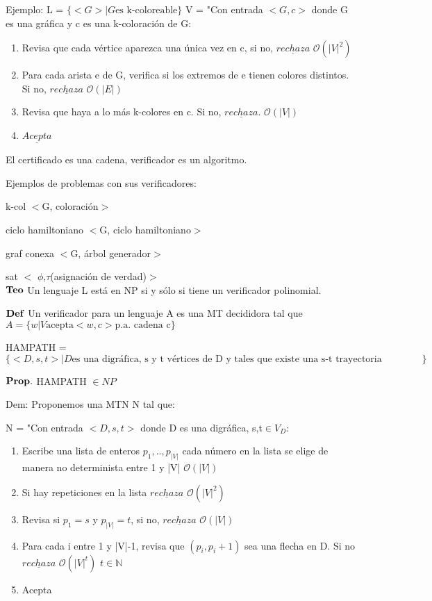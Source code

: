 \documentclass{homework}
\begin{document}
Ejemplo:
L = $\{<G>| G \text{es k-coloreable}\}$
V = "Con entrada $<G,c>$ donde G es una gráfica y c es una k-coloración de G:
\begin{enumerate}
	\item Revisa que cada vértice aparezca una única vez en c, si no, $\underline{rechaza}$ $\mathcal{O}(|V|^{2})$
	\item  Para cada arista e de G, verifica si los extremos de e tienen colores distintos. Si no, $\underline{rechaza}$ $\mathcal{O}(|E|)$
	\item Revisa que haya a lo más k-colores en c. Si no, $\underline{rechaza}$. $\mathcal{O}(|V|)$
	\item  $\underline{Acepta}$
\end{enumerate}

El certificado es una cadena, verificador es un algoritmo.

Ejemplos de problemas con sus verificadores:

k-col $<$G, coloración$>$

ciclo hamiltoniano $<$G, ciclo hamiltoniano$>$

graf conexa $<$G, árbol generador$>$

sat $<$ $\phi$,$\tau$(asignación de verdad)$>$\\

$\bf{Teo}$ Un lenguaje L está en NP si y sólo si tiene un verificador polinomial.

$\bf{Def}$ Un verificador para un lenguaje A es una MT decididora tal que $A =\{w | V \text{acepta} <w,c> \text{p.a. cadena c}\}$

HAMPATH = $\{<D,s,t>| D \text{es una digráfica, s y t vértices de D y tales que existe una s-t trayectoria hamiltoniana} \}$

$\bf{Prop.}$ HAMPATH $\in NP$

Dem: Proponemos una MTN N tal que: 

N = "Con entrada $<D,s,t>$ donde D es una digráfica, s,t$\in V_D$:
\begin{enumerate}
	\item Escribe una lista de enteros $p_1,..,p_{|V|}$ cada número en la lista se elige de manera no determinista entre 1 y |V| $\mathcal{O}(|V|)$
	\item Si hay repeticiones en la lista $\underline{rechaza}$ $\mathcal{O}(|V|^{2})$
	\item Revisa si $p_1 = s$ y $p_{|V|}=t$, si no, $\underline{rechaza}$ $\mathcal{O}(|V|)$
	\item Para cada i entre 1 y |V|-1, revisa que $(p_i,p_i+1)$ sea una flecha en D. Si no $\underline{rechaza}$ $\mathcal{O}(|V|^{t})$ $t \in \mathds{N}$
	\item Acepta
\end{enumerate}
\end{document}
